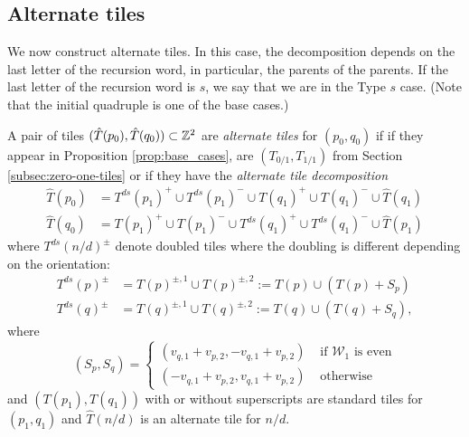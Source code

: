 \documentclass[12pt]{amsart}
\begin{document}
\subsection{Alternate tiles}
We now construct alternate tiles. In this case, the decomposition depends on the last letter of the recursion word, in particular, the parents of the parents. If the last letter of the recursion word is $s$, we say that we are in the Type $s$ case. (Note that the initial quadruple is one of the base cases.)
\begin{definition} \label{def:alternate_tiles}
	
A pair of tiles $(\hat{T}(p_0), \hat{T}(q_0)) \subset \mathbb{Z}^2$ are {\it alternate tiles} for $(p_0, q_0)$ if
if they appear in Proposition \ref{prop:base_cases}, are $(T_{0/1},T_{1/1})$ from Section \ref{subsec:zero-one-tiles}
or if they have the {\it alternate tile decomposition}
\begin{equation} \label{eq:alt_decomp}
\begin{aligned}
\hat{T}(p_0) &= T^{ds}(p_1)^+ \cup  T^{ds}(p_1)^- \cup  T(q_1)^+ \cup T(q_1)^- \cup \hat{T}(q_1) \\
\hat{T}(q_0) &= T(p_1)^+ \cup T(p_1)^- \cup T^{ds}(q_1)^+ \cup T^{ds}(q_1)^- \cup \hat{T}(p_1)
\end{aligned}
\end{equation}
where $T^{ds}(n/d)^{\pm}$ denote doubled tiles where the doubling is different depending on the orientation:
\begin{equation} \label{eq:alt_doubled}
\begin{aligned}
T^{ds}(p)^{\pm} &= T(p)^{\pm,1} \cup T(p)^{\pm,2} :=  T(p) \cup (T(p) + S_{p}) \\
T^{ds}(q)^{\pm} &= T(q)^{\pm,1} \cup T(q)^{\pm,2} := T(q) \cup (T(q) + S_{q}),
\end{aligned}
\end{equation}
where
\begin{equation}
(S_{p}, S_{q}) = \begin{cases}
(v_{q,1} + v_{p,2}, -v_{q,1} + v_{p,2}) &\mbox{ if $\mathcal{W}_1$ is even} \\
(-v_{q,1} + v_{p,2}, v_{q,1} + v_{p,2}) &\mbox{ otherwise}  
\end{cases}
\end{equation}
and $(T(p_1), T(q_1))$ with or without superscripts are standard tiles for $(p_1,q_1)$ and $\hat{T}(n/d)$ is an alternate tile for $n/d$.



\end{definition}
\end{document}
